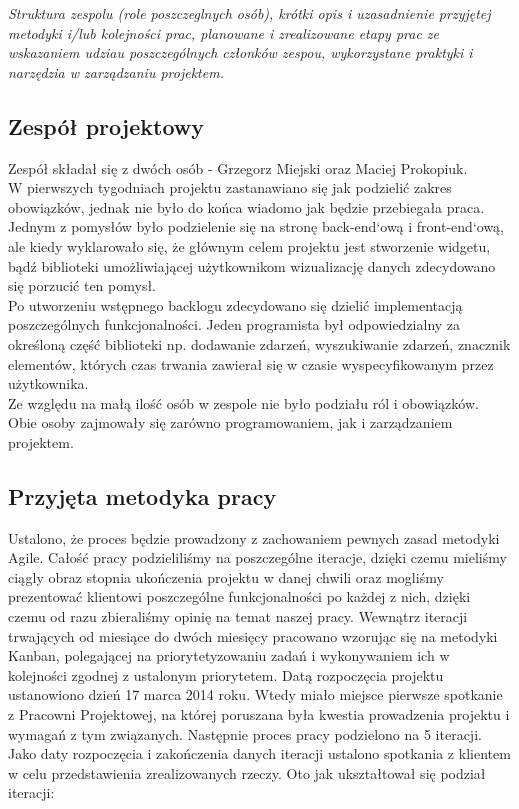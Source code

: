 \documentclass[polish,12pt]{aghthesis}
\begin{document}
\emph{Struktura zespolu (role poszczeglnych osób), krótki opis i
  uzasadnienie przyjętej metodyki i/lub kolejności prac, planowane i
  zrealizowane etapy prac ze wskazaniem udziau poszczególnych
  członków zespou, wykorzystane praktyki i narzędzia w zarządzaniu
  projektem.}
\subsection{Zespół projektowy}

Zespół składał się z dwóch osób - Grzegorz Miejski oraz Maciej Prokopiuk.
\\

W pierwszych tygodniach projektu zastanawiano się jak podzielić zakres obowiązków, jednak nie było do końca wiadomo jak będzie przebiegała praca. Jednym z pomysłów było podzielenie się na stronę back-end`ową i front-end`ową, ale kiedy wyklarowało się, że głównym celem projektu jest stworzenie widgetu, bądź biblioteki umożliwiającej użytkownikom wizualizację danych zdecydowano się porzucić ten pomysł. 
\\

Po utworzeniu wstępnego backlogu zdecydowano się dzielić implementacją poszczególnych funkcjonalności. Jeden programista był odpowiedzialny za określoną część biblioteki np. dodawanie zdarzeń, wyszukiwanie zdarzeń, znacznik elementów, których czas trwania zawierał się w czasie wyspecyfikowanym przez użytkownika.
\\

Ze względu na małą ilość osób w zespole nie było podziału ról i obowiązków. Obie osoby zajmowały się zarówno programowaniem, jak i zarządzaniem projektem.  
\\

\subsection{Przyjęta metodyka pracy}

Ustalono, że proces będzie prowadzony z zachowaniem pewnych zasad metodyki Agile. Całość pracy podzieliliśmy na poszczególne iteracje, dzięki czemu mieliśmy ciągly obraz stopnia ukończenia projektu w danej chwili oraz mogliśmy prezentować klientowi poszczególne funkcjonalności po każdej z nich, dzięki czemu od razu zbieraliśmy opinię na temat naszej pracy. Wewnątrz iteracji trwających od miesiące do dwóch miesięcy pracowano wzorując się na metodyki Kanban, polegającej na priorytetyzowaniu zadań i wykonywaniem ich w kolejności zgodnej z ustalonym priorytetem. Datą rozpoczęcia projektu ustanowiono dzień 17 marca 2014 roku. Wtedy miało miejsce pierwsze spotkanie z Pracowni Projektowej, na której poruszana była kwestia prowadzenia projektu i wymagań z tym związanych. Następnie proces pracy podzielono na 5 iteracji. Jako daty rozpoczęcia i zakończenia danych iteracji ustalono spotkania z klientem w celu przedstawienia zrealizowanych rzeczy. Oto jak ukształtował się podział iteracji: 
\\\\
\end{document}
